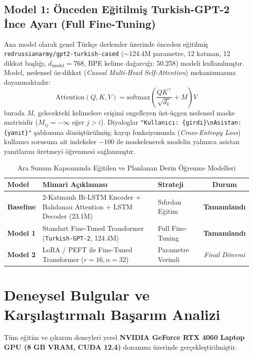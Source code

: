 \documentclass[conference]{IEEEtran}
\begin{document}
\subsection{Model 1: Önceden Eğitilmiş Turkish-GPT-2 İnce Ayarı (Full Fine-Tuning)}
Ana model olarak genel Türkçe derlemler üzerinde önceden eğitilmiş \texttt{redrussianarmy/gpt2-turkish-cased} ($\sim$124.4M parametre, 12 katman, 12 dikkat başlığı, $d_{\text{model}}=768$, BPE kelime dağarcığı: 50.258) modeli kullanılmıştır. Model, nedensel öz-dikkat (\textit{Causal Multi-Head Self-Attention}) mekanizmasına dayanmaktadır:
\begin{equation}
    \text{Attention}(Q, K, V) = \text{softmax}\left(\frac{QK^\top}{\sqrt{d_k}} + M\right)V
\end{equation}
burada $M$, gelecekteki kelimelere erişimi engelleyen üst-üçgen nedensel maske matrisidir ($M_{ij} = -\infty \text{ eğer } j > i$). Diyaloglar \texttt{"Kullanıcı: \{girdi\}\textbackslash nAsistan: \{yanıt\}"} şablonuna dönüştürülmüş; kayıp fonksiyonunda (\textit{Cross-Entropy Loss}) kullanıcı sorusuna ait indeksler $-100$ ile maskelenerek modelin yalnızca asistan yanıtlarını üretmeyi öğrenmesi sağlanmıştır.

\begin{table}[htbp]
    \centering
    \caption{Ara Sunum Kapsamında Eğitilen ve Planlanan Derin Öğrenme Modelleri}
    \label{tab:models}
    \begin{tabularx}{\columnwidth}{l X l c}
        \toprule
        \textbf{Model} & \textbf{Mimari Açıklaması} & \textbf{Strateji} & \textbf{Durum} \\
        \midrule
        \textbf{Baseline} & 2-Katmanlı Bi-LSTM Encoder + Bahdanau Attention + LSTM Decoder (23.1M) & Sıfırdan Eğitim & \textbf{Tamamlandı} \\
        \addlinespace[3pt]
        \textbf{Model 1} & Standart Fine-Tuned Transformer (\texttt{Turkish-GPT-2}, 124.4M) & Full Fine-Tuning & \textbf{Tamamlandı} \\
        \addlinespace[3pt]
        \textbf{Model 2} & LoRA / PEFT ile Fine-Tuned Transformer ($r=16, \alpha=32$) & Parametre Verimli & \textit{Final Dönemi} \\
        \bottomrule
    \end{tabularx}
\end{table}

\section{Deneysel Bulgular ve Karşılaştırmalı Başarım Analizi}
Tüm eğitim ve çıkarım deneyleri yerel \textbf{NVIDIA GeForce RTX 4060 Laptop GPU (8 GB VRAM, CUDA 12.4)} donanımı üzerinde gerçekleştirilmiştir.
\end{document}
